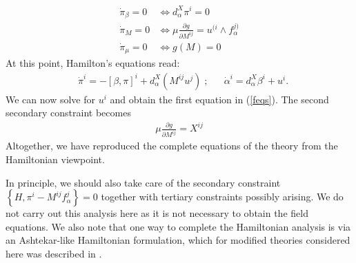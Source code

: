\documentclass[a4paper,12pt]{article}
\newcommand{\pa}{\partial}
\newcommand{\W}{\wedge}
\begin{document}
\begin{align*}
\dot{\pi}_{\beta}=0& \Leftrightarrow d^X_{\alpha} \pi^i =0 \\
 \dot{\pi}_{M} =0& \Leftrightarrow  \mu \frac{\pa g}{\pa M^{ij}} = u^{(i} \W f^{j)}_{\alpha} \\
 \dot{\pi}_{\mu}=0& \Leftrightarrow g\left(M \right)=0
\end{align*}
At this point, Hamilton's equations read:
\begin{align*}
&\dot{\pi}^i = -[\beta,\pi]^i + d^X_{\alpha} \left( M^{ij} u^j\right) \;;& & \dot{\alpha}^i = d^X_{\alpha} \beta^i + u^i.
\end{align*}
We can now solve for $u^i$ and obtain the first equation in (\ref{feqs}). The second secondary constraint becomes 
\begin{align}\label{apdx: sec ctr}
\mu \frac{\pa g}{\pa M^{ij}} = X^{ij} 
\end{align} 
Altogether, we have reproduced the complete equations of the theory from the Hamiltonian viewpoint. 

In principle, we should also take care of the secondary constraint $\left\{ H , \pi^i- M^{ij} f^j_\alpha \right\}=0$ together with tertiary constraints possibly arising. We do not carry out this analysis here as it is not necessary to obtain the field equations. We also note that one way to complete the Hamiltonian analysis is via an Ashtekar-like Hamiltonian formulation, which for modified theories considered here was described in \cite{Krasnov:2008zz}. 
\end{document}
